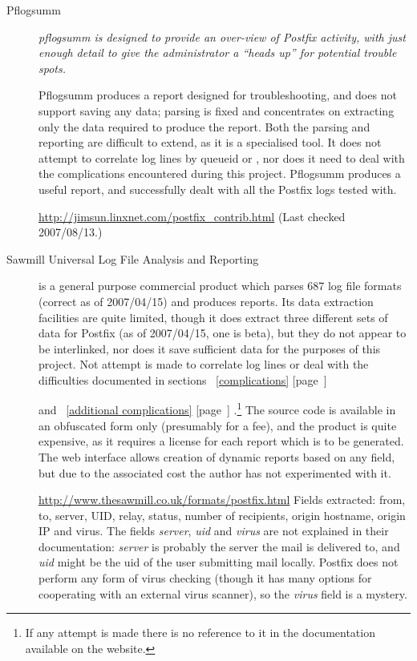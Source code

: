 \documentclass[a4paper,12pt,draft]{article}
\newcommand{\refwithpage}[1]{%
    \empty{}\ref{#1} [page~\pageref{#1}]%
}
\begin{document}
\begin{description}

    \item [Pflogsumm] \textit{pflogsumm is designed to provide an over-view
        of Postfix activity, with just enough detail to give the
        administrator a ``heads up'' for potential trouble spots.\/}

        Pflogsumm produces a report designed for troubleshooting, and does
        not support saving any data; parsing is fixed and concentrates on
        extracting only the data required to produce the report.  Both the
        parsing and reporting are difficult to extend, as it is a
        specialised tool.  It does not attempt to correlate log lines by
        queueid or \pid{}, nor does it need to deal with the complications
        encountered during this project.  Pflogsumm produces a useful
        report, and successfully dealt with all the Postfix logs tested
        with.

        \url{http://jimsun.linxnet.com/postfix_contrib.html} \newline (Last
        checked 2007/08/13.)

    \item [Sawmill Universal Log File Analysis and Reporting] is a general
        purpose commercial product which parses 687 log file formats
        (correct as of 2007/04/15) and produces reports.  Its data
        extraction facilities are quite limited, though it does extract
        three different sets of data for Postfix (as of 2007/04/15, one is
        beta), but they do not appear to be interlinked, nor does it save
        sufficient data for the purposes of this project.  Not attempt is
        made to correlate log lines or deal with the difficulties
        documented in sections~\refwithpage{complications}
        and~\refwithpage{additional complications}.\footnote{If any attempt
        is made there is no reference to it in the documentation available
        on the website.} The source code is available in an obfuscated form
        only (presumably for a fee), and the product is quite expensive, as
        it requires a license for each report which is to be generated.
        The web interface allows creation of dynamic reports based on any
        field, but due to the associated cost the author has not
        experimented with it.

        \url{http://www.thesawmill.co.uk/formats/postfix.html} \newline
        Fields extracted: from, to, server, UID, relay, status, number of
        recipients, origin hostname, origin IP and virus.  The fields
        \textit{server}, \textit{uid\/} and \textit{virus\/} are not
        explained in their documentation: \textit{server\/} is probably the
        server the mail is delivered to, and \textit{uid\/} might be the
        uid of the user submitting mail locally.  Postfix does not perform
        any form of virus checking (though it has many options for
        cooperating with an external virus scanner), so the
        \textit{virus\/} field is a mystery.


\end{description}
\end{document}

